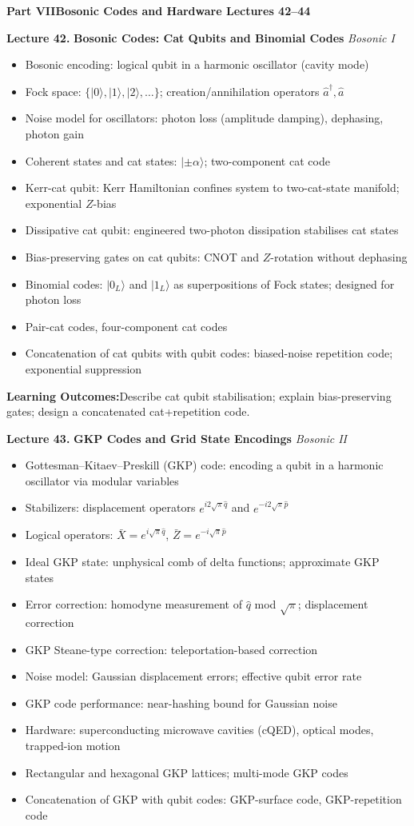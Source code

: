 \documentclass[12pt,oneside]{article}
\newcommand{\parthead}[3]{%
  \vspace{16pt}
  \begin{tcolorbox}[
    enhanced,colback=partbg,colframe=partbg,
    arc=3pt,left=10pt,right=10pt,top=7pt,bottom=7pt,boxrule=0pt
  ]
    \color{white}\large\bfseries
    Part #1\enspace\textbar\enspace #2
    \hfill\normalfont\normalsize\color{white!80!partbg}Lectures #3
  \end{tcolorbox}
  \vspace{2pt}
}
\newcommand{\lecturetitle}[3]{%
  \vspace{10pt}
  \begin{tcolorbox}[
    enhanced,breakable,
    colback=highlight,colframe=accent,
    arc=2pt,left=10pt,right=8pt,top=7pt,bottom=7pt,boxrule=0.7pt
  ]
    \textbf{\color{accent}Lecture #1.\enspace}%
    {\color{primary}\bfseries #2}%
    \hfill{\small\color{warmgold}\textit{#3}}
  \end{tcolorbox}
  \vspace{-2pt}
}
\newcommand{\topics}[1]{%
  \begin{itemize}[leftmargin=1.5em,itemsep=1.5pt,topsep=3pt,parsep=0pt]
    #1
  \end{itemize}\vspace{2pt}
}
\newcommand{\T}[1]{\item #1}
\newcommand{\keybox}[1]{%
  \begin{tcolorbox}[
    enhanced,colback=lightgray,colframe=rulegray,
    arc=2pt,left=8pt,right=8pt,top=5pt,bottom=5pt,boxrule=0.4pt,
    fontupper=\small
  ]
    \textbf{\color{primary}Learning Outcomes:\enspace}#1
  \end{tcolorbox}\vspace{4pt}
}
\begin{document}

\parthead{VII}{Bosonic Codes and Hardware}{42--44}

\lecturetitle{42}{Bosonic Codes: Cat Qubits and Binomial Codes}{Bosonic I}

\topics{
  \T{Bosonic encoding: logical qubit in a harmonic oscillator (cavity mode)}
  \T{Fock space: $\{|0\rangle, |1\rangle, |2\rangle, \ldots\}$; creation/annihilation operators $\hat{a}^\dagger, \hat{a}$}
  \T{Noise model for oscillators: photon loss (amplitude damping), dephasing, photon gain}
  \T{Coherent states and cat states: $|\pm\alpha\rangle$; two-component cat code}
  \T{Kerr-cat qubit: Kerr Hamiltonian confines system to two-cat-state manifold; exponential $Z$-bias}
  \T{Dissipative cat qubit: engineered two-photon dissipation stabilises cat states}
  \T{Bias-preserving gates on cat qubits: CNOT and $Z$-rotation without dephasing}
  \T{Binomial codes: $|0_L\rangle$ and $|1_L\rangle$ as superpositions of Fock states; designed for photon loss}
  \T{Pair-cat codes, four-component cat codes}
  \T{Concatenation of cat qubits with qubit codes: biased-noise repetition code; exponential suppression}
}

\keybox{Describe cat qubit stabilisation; explain bias-preserving gates; design a concatenated cat+repetition code.}

\lecturetitle{43}{GKP Codes and Grid State Encodings}{Bosonic II}

\topics{
  \T{Gottesman--Kitaev--Preskill (GKP) code: encoding a qubit in a harmonic oscillator via modular variables}
  \T{Stabilizers: displacement operators $e^{i2\sqrt{\pi}\hat{q}}$ and $e^{-i2\sqrt{\pi}\hat{p}}$}
  \T{Logical operators: $\bar{X}=e^{i\sqrt{\pi}\hat{q}}$, $\bar{Z}=e^{-i\sqrt{\pi}\hat{p}}$}
  \T{Ideal GKP state: unphysical comb of delta functions; approximate GKP states}
  \T{Error correction: homodyne measurement of $\hat{q}$ mod $\sqrt{\pi}$; displacement correction}
  \T{GKP Steane-type correction: teleportation-based correction}
  \T{Noise model: Gaussian displacement errors; effective qubit error rate}
  \T{GKP code performance: near-hashing bound for Gaussian noise}
  \T{Hardware: superconducting microwave cavities (cQED), optical modes, trapped-ion motion}
  \T{Rectangular and hexagonal GKP lattices; multi-mode GKP codes}
  \T{Concatenation of GKP with qubit codes: GKP-surface code, GKP-repetition code}
}
\end{document}
